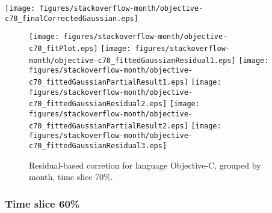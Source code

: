\begin{center}
{\texttt{[image: figures/stackoverflow-month/objective-c70\_finalCorrectedGaussian.eps]}}
\end{center}

\FloatBarrier

\begin{figure}[t]
\centering
{}
{\texttt{[image: figures/stackoverflow-month/objective-c70\_fitPlot.eps]}}
{\texttt{[image: figures/stackoverflow-month/objective-c70\_fittedGaussianResidual1.eps]}}
{\texttt{[image: figures/stackoverflow-month/objective-c70\_fittedGaussianPartialResult1.eps]}}
{\texttt{[image: figures/stackoverflow-month/objective-c70\_fittedGaussianResidual2.eps]}}
{\texttt{[image: figures/stackoverflow-month/objective-c70\_fittedGaussianPartialResult2.eps]}}
{\texttt{[image: figures/stackoverflow-month/objective-c70\_fittedGaussianResidual3.eps]}}
\caption{Residual-based corretion for language Objective-C, grouped by month, time slice 70\%.}
\end{figure}


\FloatBarrier


\subsubsection{Time slice 60\%}

